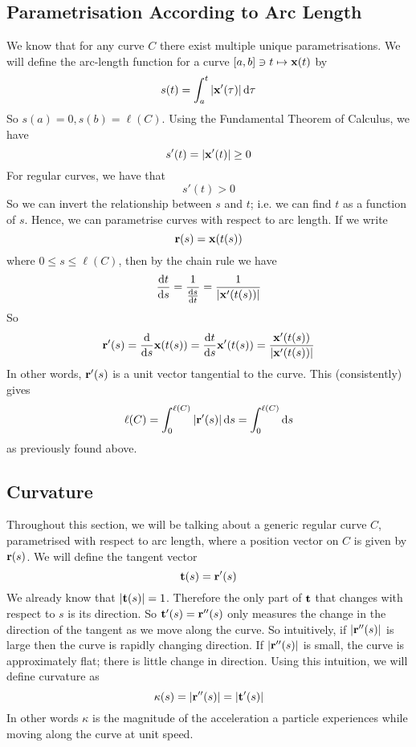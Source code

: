 \subsection{Parametrisation According to Arc Length}
We know that for any curve \(C\) there exist multiple unique parametrisations. We will define the arc-length function for a curve \([a, b] \ni t \mapsto \vb x(t)\) by
\[ s(t) = \int_a^t \abs{\vb x'(\tau)} \,\dd \tau \]
So \(s(a) = 0, s(b) = \ell(C)\). Using the Fundamental Theorem of Calculus, we have
\[ s'(t) = \abs{\vb x'(t)} \geq 0 \]
For regular curves, we have that
\[ s'(t) > 0 \]
So we can invert the relationship between \(s\) and \(t\); i.e. we can find \(t\) as a function of \(s\). Hence, we can parametrise curves with respect to arc length. If we write
\[ \vb r(s) = \vb x(t(s)) \]
where \(0 \leq s \leq \ell(C)\), then by the chain rule we have
\[ \frac{\dd{t}}{\dd{s}} = \frac{1}{\frac{\dd{s}}{\dd{t}}} = \frac{1}{\abs{\vb x'(t(s))}} \]
So
\[ \vb r'(s) = \frac{\dd}{\dd{s}} \vb x(t(s)) = \frac{\dd{t}}{\dd{s}} \vb x'(t(s)) = \frac{\vb x'(t(s))}{\abs{\vb x'(t(s))}} \]
In other words, \(\vb r'(s)\) is a unit vector tangential to the curve. This (consistently) gives
\[ \ell(C) = \int_0^{\ell(C)} \abs{\vb r'(s)} \dd{s} = \int_0^{\ell(C)} \dd{s} \]
as previously found above.

\subsection{Curvature}
Throughout this section, we will be talking about a generic regular curve \(C\), parametrised with respect to arc length, where a position vector on \(C\) is given by \(\vb r(s)\). We will define the tangent vector
\[ \vb t(s) = \vb r'(s) \]
We already know that \(\abs{\vb t(s)} = 1\). Therefore the only part of \(\vb t\) that changes with respect to \(s\) is its direction. So \(\vb t'(s) = \vb r''(s)\) only measures the change in the direction of the tangent as we move along the curve. So intuitively, if \(\abs{\vb r''(s)}\) is large then the curve is rapidly changing direction. If \(\abs{\vb r''(s)}\) is small, the curve is approximately flat; there is little change in direction. Using this intuition, we will define curvature as
\[ \kappa(s) = \abs{\vb r''(s)} = \abs{\vb t'(s)} \]
In other words \(\kappa\) is the magnitude of the acceleration a particle experiences while moving along the curve at unit speed.

